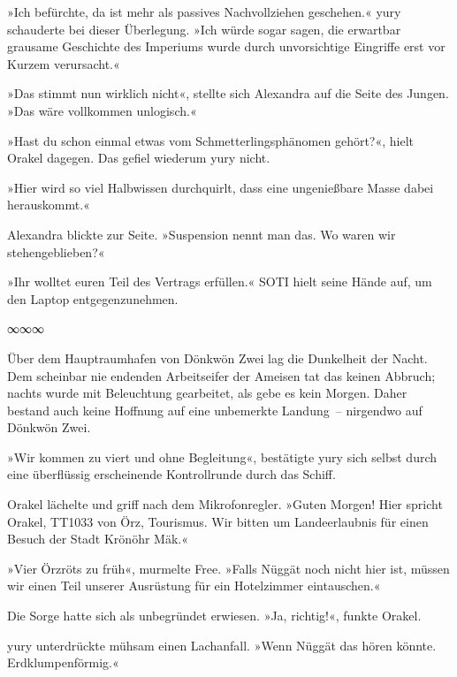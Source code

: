 »Ich befürchte, da ist mehr als passives Nachvollziehen geschehen.« yury schauderte bei dieser Überlegung. »Ich würde sogar sagen, die erwartbar grausame Geschichte des Imperiums wurde durch unvorsichtige Eingriffe erst vor Kurzem verursacht.«

»Das stimmt nun wirklich nicht«, stellte sich Alexandra auf die Seite des Jungen. »Das wäre vollkommen unlogisch.«

»Hast du schon einmal etwas vom Schmetterlingsphänomen gehört?«, hielt Orakel dagegen. Das gefiel wiederum yury nicht.

»Hier wird so viel Halbwissen durchquirlt, dass eine ungenießbare Masse dabei herauskommt.«

Alexandra blickte zur Seite. »Suspension nennt man das. Wo waren wir stehengeblieben?«

»Ihr wolltet euren Teil des Vertrags erfüllen.« SOTI hielt seine Hände auf, um den Laptop entgegenzunehmen.

\begin{center}
∞∞∞
\end{center}

Über dem Hauptraumhafen von Dönkwön Zwei lag die Dunkelheit der Nacht. Dem scheinbar nie endenden Arbeitseifer der Ameisen tat das keinen Abbruch; nachts wurde mit Beleuchtung gearbeitet, als gebe es kein Morgen. Daher bestand auch keine Hoffnung auf eine unbemerkte Landung~– nirgendwo auf Dönkwön Zwei.

»Wir kommen zu viert und ohne Begleitung«, bestätigte yury sich selbst durch eine überflüssig erscheinende Kontrollrunde durch das Schiff.

Orakel lächelte und griff nach dem Mikrofonregler. »Guten Morgen! Hier spricht Orakel, TT1033 von Örz, Tourismus. Wir bitten um Landeerlaubnis für einen Besuch der Stadt Krönöhr Mäk.«

»Vier Örzröts zu früh«, murmelte Free. »Falls Nüggät noch nicht hier ist, müssen wir einen Teil unserer Ausrüstung für ein Hotelzimmer eintauschen.«


Die Sorge hatte sich als unbegründet erwiesen. »Ja, richtig!«, funkte Orakel.


yury unterdrückte mühsam einen Lachanfall. »Wenn Nüggät das hören könnte. Erdklumpenförmig.«

